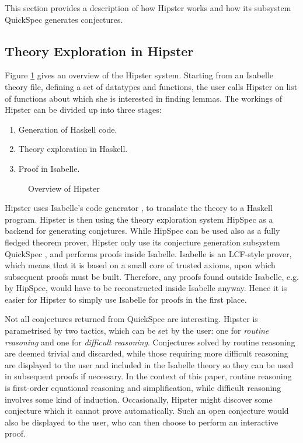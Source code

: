\label{sec:background}
This section provides a description of how Hipster works and how its subsystem QuickSpec generates conjectures.

\subsection{Theory Exploration in Hipster}
Figure \ref{fig:hipster} gives an overview of the Hipster system. Starting from an Isabelle theory file, defining a set of datatypes and functions, the user calls Hipster on list of functions about which she is interested in finding lemmas. The workings of Hipster can be divided up into three stages:
\begin{enumerate}
\item Generation of Haskell code. 
\item Theory exploration in Haskell.
\item Proof in Isabelle.
\end{enumerate}
\begin{figure}[htbp]
\begin{center}
\caption{Overview of Hipster}
\label{fig:hipster}
\end{center}
\end{figure}
Hipster uses Isabelle's code generator \cite{codegen2}, to translate the theory to a Haskell program. Hipster is then using the theory exploration system HipSpec as a backend for generating conjctures. While HipSpec can be used also as a fully fledged theorem prover, Hipster only use its conjecture generation subsystem QuickSpec \cite{quickspec}, and performs proofs inside Isabelle. Isabelle is an LCF-style prover, which means that it is based on a small core of trusted axioms, upon which subsequent proofs must be built. Therefore, any proofs found outside Isabelle, e.g. by HipSpec, would have to be reconstructed inside Isabelle anyway. Hence it is easier for Hipster to simply use Isabelle for proofs in the first place. 

Not all conjectures returned from QuickSpec are interesting. Hipster is parametrised by two tactics, which can be set by the user: one for \emph{routine reasoning} and one for \emph{difficult reasoning}. Conjectures solved by routine reasoning are deemed trivial and discarded, while those requiring more difficult reasoning are displayed to the user and included in the Isabelle theory so they can be used in subsequent proofs if necessary. In the context of this paper, routine reasoning is first-order equational reasoning and simplification, while difficult reasoning involves some kind of induction. Occasionally, Hipster might discover some conjecture which it cannot prove automatically. Such an open conjecture would also be displayed to the user, who can then choose to perform an interactive proof.

